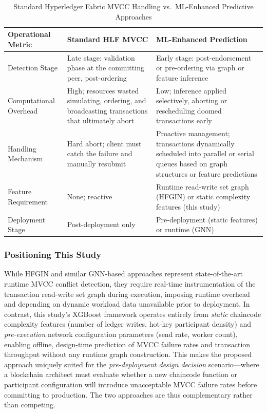 \documentclass[manuscript,screen]{acmart}
\begin{document}
\begin{table}[htbp]
\centering
\caption{Standard Hyperledger Fabric MVCC Handling vs.\ ML-Enhanced Predictive Approaches}
\label{tab:mvcc_comparison}
\small
\begin{tabular}{p{2.8cm}p{4.5cm}p{4.5cm}}
\hline
\textbf{Operational Metric} & \textbf{Standard HLF MVCC} & \textbf{ML-Enhanced Prediction} \\
\hline
Detection Stage & Late stage: validation phase at the committing peer, post-ordering \citep{debreczeni_transaction_2024} & Early stage: post-endorsement or pre-ordering via graph or feature inference \citep{alzahrani_hfgin_2025} \\
\hline
Computational Overhead & High; resources wasted simulating, ordering, and broadcasting transactions that ultimately abort \citep{alzahrani_hfgin_2025} & Low; inference applied selectively, aborting or rescheduling doomed transactions early \citep{alzahrani_hfgin_2025} \\
\hline
Handling Mechanism & Hard abort; client must catch the failure and manually resubmit \citep{debreczeni_transaction_2024} & Proactive management; transactions dynamically scheduled into parallel or serial queues based on graph structures or feature predictions \citep{alzahrani_hfgin_2025} \\
\hline
Feature Requirement & None; reactive & Runtime read-write set graph (HFGIN) or static complexity features (this study) \\
\hline
Deployment Stage & Post-deployment only & Pre-deployment (static features) or runtime (GNN) \\
\hline
\end{tabular}
\end{table}

\subsubsection{Positioning This Study}

While HFGIN and similar GNN-based approaches represent state-of-the-art runtime MVCC conflict detection, they require real-time instrumentation of the transaction read-write set graph during execution, imposing runtime overhead and depending on dynamic workload data unavailable prior to deployment. In contrast, this study's XGBoost framework operates entirely from \textit{static} chaincode complexity features (number of ledger writes, hot-key participant density) and \textit{pre-execution} network configuration parameters (send rate, worker count), enabling offline, design-time prediction of MVCC failure rates and transaction throughput without any runtime graph construction. This makes the proposed approach uniquely suited for the \textit{pre-deployment design decision} scenario---where a blockchain architect must evaluate whether a new chaincode function or participant configuration will introduce unacceptable MVCC failure rates before committing to production. The two approaches are thus complementary rather than competing.
\end{document}
